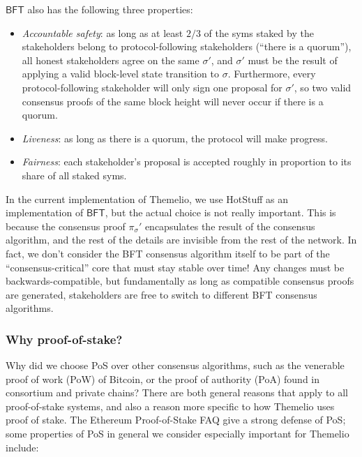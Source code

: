 \documentclass[letterpaper,12pt,oneside]{article}
\begin{document}
$\mathsf{BFT}$ also has the following three properties:
\begin{itemize}
    \item \emph{Accountable safety}: as long as at least $2/3$ of the syms staked by the stakeholders belong to protocol-following stakeholders (``there is a quorum''), all honest stakeholders agree on the same $\sigma'$, and $\sigma'$ must be the result of applying a valid block-level state transition to $\sigma$. Furthermore, every protocol-following stakeholder will only sign one proposal for $\sigma'$, so two valid consensus proofs of the same block height will never occur if there is a quorum.
    \item \emph{Liveness}: as long as there is a quorum, the protocol will make progress.
    \item \emph{Fairness}: each stakeholder's proposal is accepted roughly in proportion to its share of all staked syms.
\end{itemize}

In the current implementation of Themelio, we use HotStuff as an implementation of $\mathsf{BFT}$, but the actual choice is not really important. This is because the consensus proof $\pi_\sigma'$ encapsulates the result of the consensus algorithm, and the rest of the details are invisible from the rest of the network. In fact, we don't consider the BFT consensus algorithm itself to be part of the ``consensus-critical'' core that must stay stable over time! Any changes must be backwards-compatible, but fundamentally as long as compatible consensus proofs are generated, stakeholders are free to switch to different BFT consensus algorithms.

\subsubsection{Why proof-of-stake?}

Why did we choose PoS over other consensus algorithms, such as the venerable proof of work (PoW) of Bitcoin, or the proof of authority (PoA) found in consortium and private chains? There are both general reasons that apply to all proof-of-stake systems, and also a reason more specific to how Themelio uses proof of stake. The Ethereum Proof-of-Stake FAQ \cite{buterin2019pos} give a strong defense of PoS; some properties of PoS in general we consider especially important for Themelio include:
\end{document}
